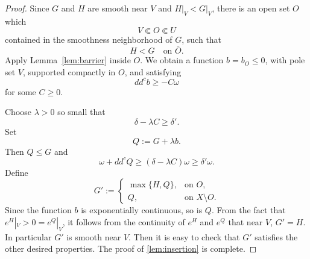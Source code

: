 \documentclass[12pt,reqno]{amsart}
\newcommand{\ddc}{dd^c}
\newcommand{\restr}[2]{\left.#1\right|_{#2}}
\begin{document}
	\begin{proof}
		Since $G$ and $H$ are smooth near $V$ and $\restr{H}{V}<\restr{G}{V}$, there is an open set $O$ which
		\[
		V\Subset O\Subset U
		\]
		contained in the smoothness neighborhood of $G$, such that
		\begin{equation}\label{eq:HbelowG}
			H<G\quad\text{on }\overline O.
		\end{equation}
		Apply Lemma~\ref{lem:barrier} inside $O$. We obtain a function $b=b_O\leq0$, with pole set $V$, supported compactly in $O$, and satisfying
		\[
		\ddc b\geq-C\omega
		\]
		for some $C\geq0$.
		
		Choose $\lambda>0$ so small that
		\begin{equation}\label{eq:lambda-choice}
			\delta-\lambda C\geq\delta'.
		\end{equation}
		Set
		\[
		Q:=G+\lambda b.
		\]
		Then $Q\leq G$ and
		\[
		\omega+\ddc Q
		\geq(\delta-\lambda C)\omega
		\geq\delta'\omega.
		\]
		Define
		\begin{equation}\label{eq:inserted-function}
			G':=
			\begin{cases}
				\max\{H,Q\},&\text{on }O,\\
				Q,&\text{on }X\setminus O.
			\end{cases}
		\end{equation}
		Since  the function $b$ is exponentially continuous, so is $Q$. From the fact that $e^H|_V>0=e^Q|_V$, it follows from the continuity of $e^H $ and $e^Q$ that near $V$, $G'=H$. In particular $G'$ is smooth near $V$.  	Then it is easy to check that $G'$ satisfies the other desired properties. The proof of \cref{lem:insertion} is complete.
		
		
	\end{proof}
	
	
\end{document}
